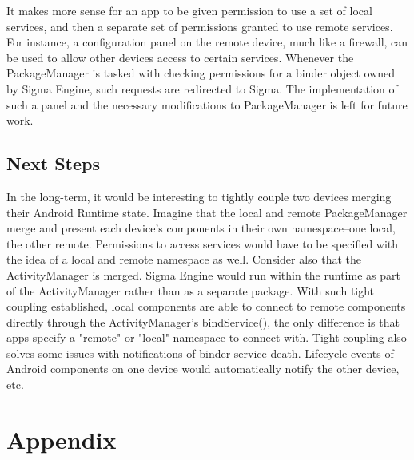 \documentclass[prodmode]{acmlarge}
\begin{document}
It makes more sense for an app to be given permission to use a set of local services, and then a separate set of permissions granted to use remote services. For instance, a configuration panel on the remote device, much like a firewall, can be used to allow other devices access to certain services. Whenever the PackageManager is tasked with checking permissions for a binder object owned by Sigma Engine, such requests are redirected to Sigma. The implementation of such a panel and the necessary modifications to PackageManager is left for future work.

\subsection{Next Steps}
In the long-term, it would be interesting to tightly couple two devices merging their Android Runtime state. Imagine that the local and remote PackageManager merge and present each device's components in their own namespace--one local, the other remote. Permissions to access services would have to be specified with the idea of a local and remote namespace as well. Consider also that the ActivityManager is merged. Sigma Engine would run within the runtime as part of the ActivityManager rather than as a separate package. With such tight coupling established, local components are able to connect to remote components directly through the ActivityManager's bindService(), the only difference is that apps specify a "remote" or "local" namespace to connect with. Tight coupling also solves some issues with notifications of binder service death. Lifecycle events of Android components on one device would automatically notify the other device, etc.

\section{Appendix}
\end{document}
